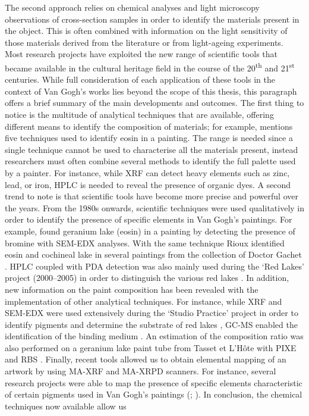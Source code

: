 The second approach relies on chemical analyses and light microscopy observations of cross-section samples in order to identify the materials present in the object. This is often combined with information on the light sensitivity of those materials derived from the literature or from light-ageing experiments. Most research projects have exploited the new range of scientific tools that became available in the cultural heritage field in the course of the 20\textsuperscript{th} and 21\textsuperscript{st} centuries. While full consideration of each application of these tools in the context of Van Gogh's works lies beyond the scope of this thesis, this paragraph offers a brief summary of the main developments and outcomes. The first thing to notice is the multitude of analytical techniques that are available, offering different means to identify the composition of materials; for example, \citet[271]{geldof_van_2013-3} mentions five techniques used to identify eosin in a painting. The range is needed since a single technique cannot be used to characterise all the materials present, instead researchers must often combine several methods to identify the full palette used by a painter. For instance, while \gls{XRF} can detect heavy elements such as zinc, lead, or iron, \gls{HPLC} is needed to reveal the presence of organic dyes. A second trend to note is that scientific tools have become more precise and powerful over the years. From the 1980s onwards, scientific techniques were used qualitatively in order to identify the presence of specific elements in Van Gogh’s paintings. For example, \citet{cadorin_decoloration_1987} found geranium lake (eosin) in a painting by detecting the presence of bromine with \gls{SEM-EDX} analyses. With the same technique Rioux identified eosin and cochineal lake in several paintings from the collection of Doctor Gachet \citep[406]{rioux_caracterisation_1999}. \gls{HPLC} coupled with \gls{PDA} detection was also mainly used during the ‘Red Lakes’ project (2000–2005) in order to distinguish the various red lakes \citep{bommel_investigation_2005}. In addition, new information on the paint composition has been revealed with the implementation of other analytical techniques. For instance, while \gls{XRF} and \gls{SEM-EDX} were used extensively during the ‘Studio Practice’ project in order to identify pigments and determine the substrate of red lakes \citep{geldof_van_2013-3, geldof_van_2013-1, geldof_van_2013}, \gls{GC-MS} enabled the identification of the binding medium \citet[277-8]{geldof_van_2013-3}. An estimation of the composition ratio was also performed on a geranium lake paint tube from Tasset et L'H\^{o}te with \gls{PIXE} and \gls{RBS} \citet[284-5]{geldof_van_2013-3}. Finally, recent tools allowed us to obtain elemental mapping of an artwork by using \gls{MA-XRF} and \gls{MA-XRPD} scanners. For instance, several research projects were able to map the presence of specific elements characteristic of certain pigments used in Van Gogh’s paintings (\citealp[Figures 1, 4 and 5]{vanmeert_chemical_2018,centeno_van_2017}; \citealp[107, Figure 4.11]{hendriks_methods_2019}). In conclusion, the chemical techniques now available allow us 